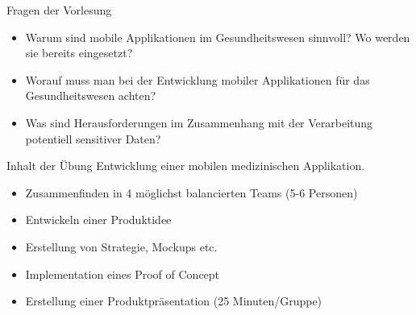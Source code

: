 \documentclass[aspectratio=169,t]{beamer}
\begin{document}
\begin{frame}{Fragen der Vorlesung}
    \begin{itemize}
        \item Warum sind mobile Applikationen im Gesundheitswesen sinnvoll? Wo werden sie bereits eingesetzt?
        \item<2-> Worauf muss man bei der Entwicklung mobiler Applikationen für das Gesundheitswesen achten?
        \item<3-> Was sind Herausforderungen im Zusammenhang mit der Verarbeitung potentiell sensitiver Daten?
    \end{itemize} 
\end{frame}

\begin{frame}{Inhalt der Übung}
    Entwicklung einer mobilen medizinischen Applikation.
    \begin{itemize}
        \item<2-> Zusammenfinden in 4 möglichst balancierten Teams (5-6 Personen)
        \item<3-> Entwickeln einer Produktidee
        \item<4-> Erstellung von Strategie, Mockups etc.
        \item<5-> Implementation eines Proof of Concept
        \item<6-> Erstellung einer Produktpräsentation (25 Minuten/Gruppe)
    \end{itemize}
\end{frame}
\end{document}
